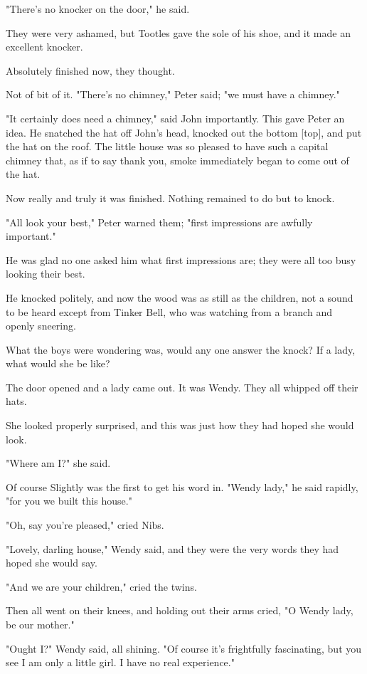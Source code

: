 "There's no knocker on the door," he said.


They were very ashamed, but Tootles gave the sole of his shoe, and it made
an excellent knocker.


Absolutely finished now, they thought.


Not of bit of it. "There's no chimney," Peter said; "we must have a
chimney."


"It certainly does need a chimney," said John importantly. This gave Peter
an idea. He snatched the hat off John's head, knocked out the bottom
[top], and put the hat on the roof. The little house was so pleased to
have such a capital chimney that, as if to say thank you, smoke
immediately began to come out of the hat.


Now really and truly it was finished. Nothing remained to do but to knock.


"All look your best," Peter warned them; "first impressions are awfully
important."


He was glad no one asked him what first impressions are; they were all too
busy looking their best.


He knocked politely, and now the wood was as still as the children, not a
sound to be heard except from Tinker Bell, who was watching from a branch
and openly sneering.


What the boys were wondering was, would any one answer the knock? If a
lady, what would she be like?


The door opened and a lady came out. It was Wendy. They all whipped off
their hats.


She looked properly surprised, and this was just how they had hoped she
would look.


"Where am I?" she said.


Of course Slightly was the first to get his word in. "Wendy lady," he said
rapidly, "for you we built this house."


"Oh, say you're pleased," cried Nibs.


"Lovely, darling house," Wendy said, and they were the very words they had
hoped she would say.


"And we are your children," cried the twins.


Then all went on their knees, and holding out their arms cried, "O Wendy
lady, be our mother."


"Ought I?" Wendy said, all shining. "Of course it's frightfully
fascinating, but you see I am only a little girl. I have no real
experience."


